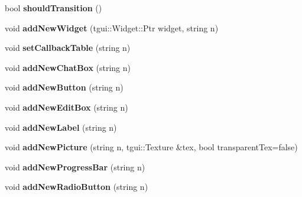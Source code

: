 \begin{DoxyCompactItemize}
\mbox{\label{classdarksun_1_1_u_i_wrangler_a24a914c537b08d9058f15396fbfb1e73}} 
bool {\bfseries should\+Transition} ()
\item 
\mbox{\label{classdarksun_1_1_u_i_wrangler_ac009de3e4beaa510d69301f735ff0071}} 
void {\bfseries add\+New\+Widget} (tgui\+::\+Widget\+::\+Ptr widget, string n)
\item 
\mbox{\label{classdarksun_1_1_u_i_wrangler_aad2627b5a272c1eb7231ee94392583a0}} 
void {\bfseries set\+Callback\+Table} (string n)
\item 
\mbox{\label{classdarksun_1_1_u_i_wrangler_acd299b77ae9f308bbe14eaf4bc9daaa6}} 
void {\bfseries add\+New\+Chat\+Box} (string n)
\item 
\mbox{\label{classdarksun_1_1_u_i_wrangler_ac30f43f854b8d876d0f6490991f01b78}} 
void {\bfseries add\+New\+Button} (string n)
\item 
\mbox{\label{classdarksun_1_1_u_i_wrangler_ac37d1300477261f3f80b745a8ec72020}} 
void {\bfseries add\+New\+Edit\+Box} (string n)
\item 
\mbox{\label{classdarksun_1_1_u_i_wrangler_af82fc313ca444bc5ab8414c372732a23}} 
void {\bfseries add\+New\+Label} (string n)
\item 
\mbox{\label{classdarksun_1_1_u_i_wrangler_a5441b7ff8ee8b47fad64198af3e61ead}} 
void {\bfseries add\+New\+Picture} (string n, tgui\+::\+Texture \&tex, bool transparent\+Tex=false)
\item 
\mbox{\label{classdarksun_1_1_u_i_wrangler_a867ddf2de8b83e6538a95ceebcda875f}} 
void {\bfseries add\+New\+Progress\+Bar} (string n)
\item 
\mbox{\label{classdarksun_1_1_u_i_wrangler_a4b46dcee79f1e83d1f817d0931a98913}} 
void {\bfseries add\+New\+Radio\+Button} (string n)
\item 
\mbox{\label{classdarksun_1_1_u_i_wrangler_aef505a9a06092c0af017cd2b48010ae5}} 

\end{DoxyCompactItemize}
